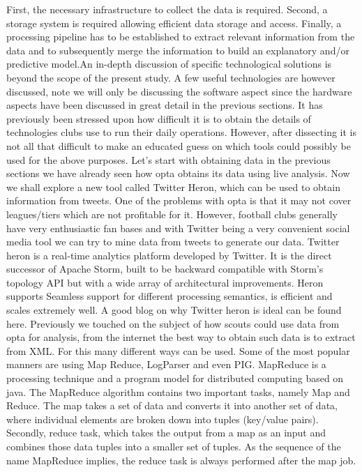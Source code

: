 \documentclass[sigconf]{acmart}
\begin{document}
First, the necessary infrastructure to collect the data is required. Second, a storage system is required allowing efficient data storage and access. Finally, a processing pipeline has to be established to extract relevant information from the data and to subsequently merge the information to build an explanatory and/or predictive model\cite{Rein2016}.An in-depth discussion of specific technological solutions is beyond the scope of the present study. A few useful technologies are however discussed, note we will only be discussing the software aspect since the hardware aspects have been discussed in great detail in the previous sections.\newline
It has previously been stressed upon how difficult it is to obtain the details of technologies clubs use to run their daily operations. However, after dissecting it is not all that difficult to make an educated guess on which tools could possibly be used for the above purposes. Let's start with obtaining data in the previous sections we have already seen how opta obtains its data using live analysis\cite{Bialik2014}. Now we shall explore a new tool called Twitter Heron, which can be used to obtain information from tweets.\newline
One of the problems with opta is that it may not cover leagues/tiers which are not profitable for it. However, football clubs generally have very enthusiastic fan bases and with Twitter being a very convenient social media tool we can try to mine data from tweets to generate our data. Twitter heron is a real-time analytics platform developed by Twitter. It is the direct successor of Apache Storm, built to be backward compatible with Storm's topology API but with a wide array of architectural improvements. Heron supports Seamless support for different processing semantics, is efficient and scales extremely well. A good blog on why Twitter heron is ideal can be found here.\cite{Ramasamy2000}\newline
Previously we touched on the subject of how scouts could use data from opta for analysis, from the internet the best way to obtain such data is to extract from XML. For this many different ways can be used. Some of the most popular manners are using Map Reduce, LogParser and even PIG.\newline
MapReduce is a processing technique and a program model for distributed computing based on java. The MapReduce algorithm contains two important tasks, namely Map and Reduce. The map takes a set of data and converts it into another set of data, where individual elements are broken down into tuples (key/value pairs). Secondly, reduce task, which takes the output from a map as an input and combines those data tuples into a smaller set of tuples. As the sequence of the name MapReduce implies, the reduce task is always performed after the map job.
\end{document}
